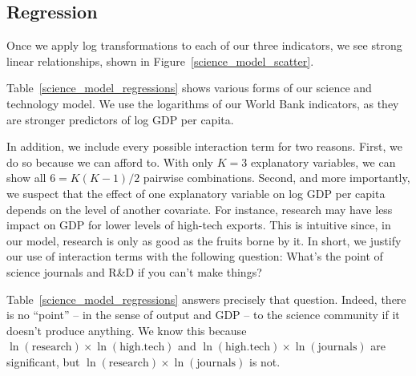 \documentclass[11pt]{article}
\begin{document}
\subsection{Regression}

Once we apply log transformations to each of our three indicators, we see strong linear relationships, shown in Figure~\ref{science_model_scatter}.

Table~\ref{science_model_regressions} shows various forms of our science and technology model. We use the logarithms of our World Bank indicators, as they are stronger predictors of log GDP per capita.

In addition, we include every possible interaction term for two reasons.
First, we do so because we can afford to. With only $K=3$ explanatory variables, we can show all $6 = K(K-1)/2$ pairwise combinations. 
Second, and more importantly, we suspect that the effect of one explanatory variable on log GDP per capita depends on the level of another covariate. For instance, research may have less impact on GDP for lower levels of high-tech exports. This is intuitive since, in our model, research is only as good as the fruits borne by it. In short, we justify our use of interaction terms with the following question: What's the point of science journals and R\&D if you can't make things?

Table~\ref{science_model_regressions} answers precisely that question. Indeed, there is no ``point'' -- in the sense of output and GDP -- to the science community if it doesn't produce anything. We know this because
$\ln(\mathrm{research}) \times \ln(\mathrm{high.tech})$ and
$\ln(\mathrm{high.tech}) \times \ln(\mathrm{journals})$
are significant, but 
$\ln(\mathrm{research}) \times \ln(\mathrm{journals})$ is not.
\end{document}
